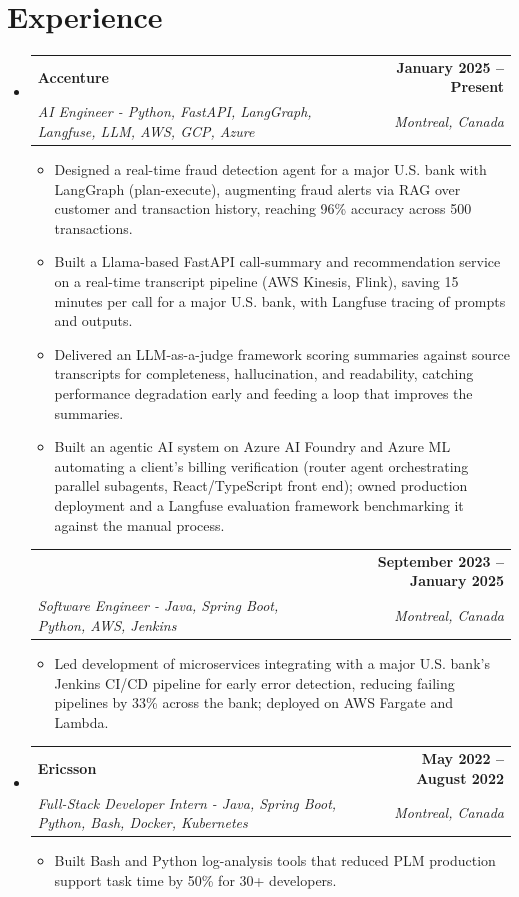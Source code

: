 \documentclass[letterpaper,11pt]{article}
\makeatletter
\newcommand{\resumeItem}[1]{
  \item\small{{#1 \vspace{-2pt}}}
}
\newcommand{\resumeSubheading}[4]{
  \vspace{-2pt}\item
    \begin{tabular*}{1.0\textwidth}[t]{l@{\extracolsep{\fill}}r}
      \textbf{#1} & \textbf{\small #2} \\
      \textit{\small#3} & \textit{\small #4} \\
    \end{tabular*}\vspace{-7pt}
}
\newcommand{\resumeSubheadingContinued}[3]{
  \vspace{4pt}
    \begin{tabular*}{1.0\textwidth}[t]{l@{\extracolsep{\fill}}r}
      & \textbf{\small #2} \\
      \textit{\small#1} & \textit{\small #3} \\
    \end{tabular*}\vspace{-7pt}
}
\newcommand{\resumeSubHeadingListStart}{\begin{itemize}[leftmargin=0.0in, label={}]}
\newcommand{\resumeSubHeadingListEnd}{\end{itemize}}
\newcommand{\resumeItemListStart}{\begin{itemize}}
\newcommand{\resumeItemListEnd}{\end{itemize}\vspace{-5pt}}
\makeatother
\begin{document}
\section{Experience}
  \resumeSubHeadingListStart
 
    \resumeSubheading
      {Accenture}{January 2025 -- Present}
      {AI Engineer - Python, FastAPI, LangGraph, Langfuse, LLM, AWS, GCP, Azure}{Montreal, Canada}
      \resumeItemListStart
        \resumeItem{Designed a real-time fraud detection agent for a major U.S. bank with LangGraph (plan-execute), augmenting fraud alerts via RAG over customer and transaction history, reaching 96\% accuracy across 500 transactions.}
        \resumeItem{Built a Llama-based FastAPI call-summary and recommendation service on a real-time transcript pipeline (AWS Kinesis, Flink), saving 15 minutes per call for a major U.S. bank, with Langfuse tracing of prompts and outputs.}
        \resumeItem{Delivered an LLM-as-a-judge framework scoring summaries against source transcripts for completeness, hallucination, and readability, catching performance degradation early and feeding a loop that improves the summaries.}
        \resumeItem{Built an agentic AI system on Azure AI Foundry and Azure ML automating a client's billing verification (router agent orchestrating parallel subagents, React/TypeScript front end); owned production deployment and a Langfuse evaluation framework benchmarking it against the manual process.}
      \resumeItemListEnd
      \vspace{-8pt}
 
    \resumeSubheadingContinued
      {Software Engineer - Java, Spring Boot, Python, AWS, Jenkins}{September 2023 -- January 2025}{Montreal, Canada}
      \resumeItemListStart
        \resumeItem{Led development of microservices integrating with a major U.S. bank's Jenkins CI/CD pipeline for early error detection, reducing failing pipelines by 33\% across the bank; deployed on AWS Fargate and Lambda.}
      \resumeItemListEnd
 
    \resumeSubheading
      {Ericsson}{May 2022 -- August 2022}
      {Full-Stack Developer Intern - Java, Spring Boot, Python, Bash, Docker, Kubernetes}{Montreal, Canada}
      \resumeItemListStart
        \resumeItem{Built Bash and Python log-analysis tools that reduced PLM production support task time by 50\% for 30+ developers.}
      \resumeItemListEnd
 
  \resumeSubHeadingListEnd
\vspace{-14pt}
 
\end{document}
